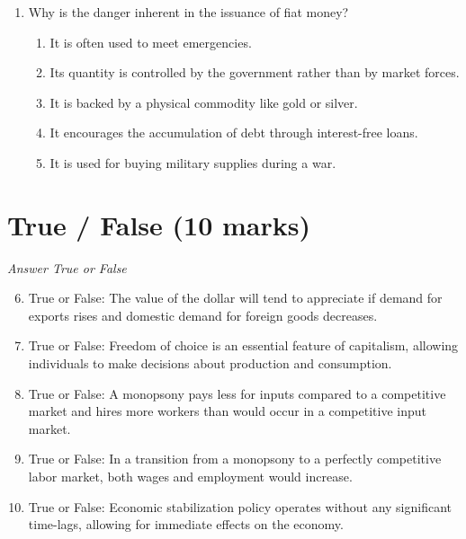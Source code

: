 \documentclass[12pt]{article}
\begin{document}
\begin{enumerate}[label=\arabic*.]
\begin{enumerate}[label=(\alph*)]
    \item The price of the land is entirely made up of transfer earnings.
    \item Economic rent remains constant while transfer earnings fluctuate with market demands.
    \item Transfer earnings are zero and the price of the land is entirely made up of economic rent.
    \item Both transfer earnings and economic rent increase proportionally.
    \item Transfer earnings and economic rent vary inversely; as one increases, the other decreases.
\end{enumerate}
\item Why is the danger inherent in the issuance of fiat money?
\begin{enumerate}[label=(\alph*)]
    \item It is often used to meet emergencies.
    \item Its quantity is controlled by the government rather than by market forces.
    \item It is backed by a physical commodity like gold or silver.
    \item It encourages the accumulation of debt through interest-free loans.
    \item It is used for buying military supplies during a war.
\end{enumerate}
\end{enumerate}

\section*{True / False (10 marks)}
\textit{Answer True or False}
\begin{enumerate}[label=\arabic*.]
\setcounter{enumi}{5}
\item True or False: The value of the dollar will tend to appreciate if demand for exports rises and domestic demand for foreign goods decreases.
\item True or False: Freedom of choice is an essential feature of capitalism, allowing individuals to make decisions about production and consumption.
\item True or False: A monopsony pays less for inputs compared to a competitive market and hires more workers than would occur in a competitive input market.
\item True or False: In a transition from a monopsony to a perfectly competitive labor market, both wages and employment would increase.
\item True or False: Economic stabilization policy operates without any significant time-lags, allowing for immediate effects on the economy.
\end{enumerate}
\end{document}
